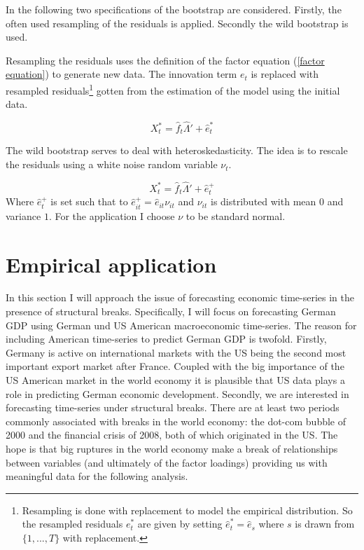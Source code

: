\documentclass[12pt]{article}
\begin{document}
In the following two specifications of the bootstrap are considered. Firstly, the often used resampling of the residuals is applied. Secondly the wild bootstrap is used. 

Resampling the residuals uses the definition of the factor equation (\ref{factor equation}) to generate new data. The innovation term $e_t$ is replaced with resampled residuals\footnote{Resampling is done with replacement to model the empirical distribution. So the resampled residuals $e_t^*$ are given by setting $\hat e_t^* = \hat e_s$ where $s$ is drawn from $\{1, ..., T\}$ with replacement.} gotten from the estimation of the model using the initial data.

\begin{equation}
	\label{factor equation, bootstrapped}
	X_t^* = \hat f_t \hat \Lambda' + \hat e_t^*
\end{equation}

The wild bootstrap serves to deal with heteroskedasticity. The idea is to rescale the residuals using a white noise random variable $\nu_t$.

$$X_t^* = \hat f_t \hat \Lambda' + \hat e_t^+$$
Where $\hat e_t^+$ is set such that to $\hat e_{it}^+ = \hat e_{it} \nu_{it}$ and $\nu_{it}$ is distributed with mean $0$ and variance $1$. For the application I choose $\nu$ to be standard normal.




\section{Empirical application}
In this section I will approach the issue of forecasting economic time-series in the presence of structural breaks. Specifically, I will focus on forecasting German GDP using German und US American macroeconomic time-series. The reason for including American time-series to predict German GDP is twofold. Firstly, Germany is active on international markets with the US being the second most important export market after France. Coupled with the big importance of the US American market in the world economy it is plausible that US data plays a role in predicting German economic development. Secondly, we are interested in forecasting time-series under structural breaks. There are at least two periods commonly associated with breaks in the world economy: the dot-com bubble of 2000 and the financial crisis of 2008, both of which originated in the US. The hope is that big ruptures in the world economy make a break of relationships between variables (and ultimately of the factor loadings) providing us with meaningful data for the following analysis.
\end{document}
